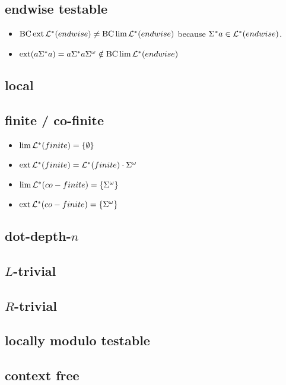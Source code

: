 \subsection{endwise testable}
\begin{itemize}
\item $\operatorname{BC} \operatorname{ext} \mathcal{L}^*(endwise) \neq \operatorname{BC} \lim \mathcal{L}^*(endwise)$ because $\Sigma^*a \in \mathcal{L}^*(endwise)$.
\item $\operatorname{ext}(a\Sigma^* a) = a \Sigma^* a \Sigma^\omega \notin \operatorname{BC} \lim \mathcal{L}^*(endwise)$
\end{itemize}

\subsection{local}
\subsection{finite / co-finite}
\begin{itemize}
\item $\lim \Lang^*(finite) = \Set{\emptyset}$
\item $\operatorname{ext} \mathcal{L}^*(finite) = \mathcal{L}^*(finite) \cdot \Sigma^\omega$
\item $\lim \Lang^*(co-finite) = \Set{\Sigma^\omega}$
\item $\ext \Lang^*(co-finite) = \Set{\Sigma^\omega}$
\end{itemize}

\subsection{dot-depth-$n$}
\subsection{$L$-trivial}
\subsection{$R$-trivial}
\subsection{locally modulo testable}


\subsection{context free}

